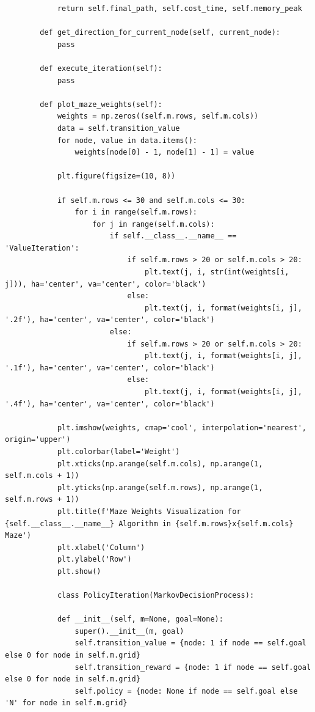 \documentclass{article}
\begin{document}
\begin{lstlisting}
            return self.final_path, self.cost_time, self.memory_peak
    
        def get_direction_for_current_node(self, current_node):
            pass
    
        def execute_iteration(self):
            pass
    
        def plot_maze_weights(self):
            weights = np.zeros((self.m.rows, self.m.cols))
            data = self.transition_value
            for node, value in data.items():
                weights[node[0] - 1, node[1] - 1] = value
    
            plt.figure(figsize=(10, 8))
    
            if self.m.rows <= 30 and self.m.cols <= 30:
                for i in range(self.m.rows):
                    for j in range(self.m.cols):
                        if self.__class__.__name__ == 'ValueIteration':
                            if self.m.rows > 20 or self.m.cols > 20:
                                plt.text(j, i, str(int(weights[i, j])), ha='center', va='center', color='black')
                            else:
                                plt.text(j, i, format(weights[i, j], '.2f'), ha='center', va='center', color='black')
                        else:
                            if self.m.rows > 20 or self.m.cols > 20:
                                plt.text(j, i, format(weights[i, j], '.1f'), ha='center', va='center', color='black')
                            else:
                                plt.text(j, i, format(weights[i, j], '.4f'), ha='center', va='center', color='black')
    
            plt.imshow(weights, cmap='cool', interpolation='nearest', origin='upper')
            plt.colorbar(label='Weight')
            plt.xticks(np.arange(self.m.cols), np.arange(1, self.m.cols + 1))
            plt.yticks(np.arange(self.m.rows), np.arange(1, self.m.rows + 1))
            plt.title(f'Maze Weights Visualization for {self.__class__.__name__} Algorithm in {self.m.rows}x{self.m.cols} Maze')
            plt.xlabel('Column')
            plt.ylabel('Row')
            plt.show()
    
            class PolicyIteration(MarkovDecisionProcess):

            def __init__(self, m=None, goal=None):
                super().__init__(m, goal)
                self.transition_value = {node: 1 if node == self.goal else 0 for node in self.m.grid}
                self.transition_reward = {node: 1 if node == self.goal else 0 for node in self.m.grid}
                self.policy = {node: None if node == self.goal else 'N' for node in self.m.grid}
        

\end{lstlisting}
\end{document}
